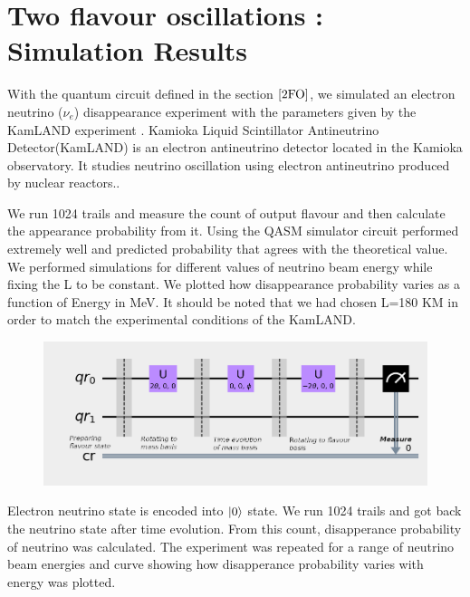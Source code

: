 \documentclass[12pt,a4paper]{report}
\begin{document}
\section{Two flavour oscillations : Simulation Results} 
With the quantum circuit defined in the section $\ref{2FO}$, we simulated an electron neutrino ($\nu_{e}$) disappearance experiment with the parameters given by the KamLAND experiment \cite{Eugichi}. Kamioka Liquid Scintillator Antineutrino Detector(KamLAND) is an electron antineutrino detector located in the Kamioka observatory. It studies neutrino oscillation using electron antineutrino produced by nuclear reactors.\cite{Iwamoto}.\par
We run 1024 trails and measure the count of output flavour and then calculate the appearance probability from it. Using the QASM simulator circuit performed extremely well and predicted probability that agrees with the theoretical value. We performed simulations for different values of neutrino beam energy while fixing the L to be constant. We plotted how disappearance probability varies as a function of Energy in MeV. It should be noted that we had chosen L=180 KM in order to match the experimental conditions of the KamLAND. 
\begin{figure}[h]
	\graphicspath{ {./Images/} }
	\centering	
	{\includegraphics[width=\textwidth]{fig_2.png}}
	\caption{}
	\label{fig 2}
\end{figure}\par
Electron neutrino state is encoded into $\ket{0}$ state. We run 1024 trails and got back the neutrino state after time evolution. From this count, disapperance probability of neutrino was calculated. The experiment was repeated for a range of neutrino beam energies and curve showing how disapperance probability varies with energy was plotted.
\end{document}
